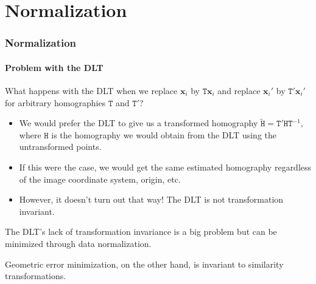 \documentclass[aspectratio=169]{beamer}
\renewcommand{\vec}[1]{\boldsymbol{#1}}
\newcommand{\mat}[1]{\mathtt{#1}}
\begin{document}
\section{Normalization}

\begin{frame}
\frametitle{Normalization}
\framesubtitle{Problem with the DLT}

What happens with the DLT when we replace $\vec{x}_i$ by
$\mat{T}\vec{x}_i$ and replace $\vec{x}_i'$ by $\mat{T}'\vec{x}_i'$
for arbitrary homographies $\mat{T}$ and $\mat{T}'$?
\begin{itemize}
\item We would prefer the DLT to give us a transformed homography
  $\tilde{\mat{H}} = \mat{T}'\mat{H}\mat{T}^{-1}$, where $\mat{H}$ is
  the homography we would obtain from the DLT using the untransformed
  points.
\item If this were the case, we would get the same estimated
  homography regardless of the image coordinate system, origin, etc.
\item However, \alert{it doesn't turn out that way}!  The DLT is
  \alert{not transformation invariant}.
\end{itemize}

The DLT's lack of transformation invariance is a big problem but can
be minimized through \alert{data normalization}.

\medskip

\alert{Geometric error minimization}, on the other hand, \alert{is}
invariant to \alert{similarity transformations}.

\end{frame}
\end{document}

